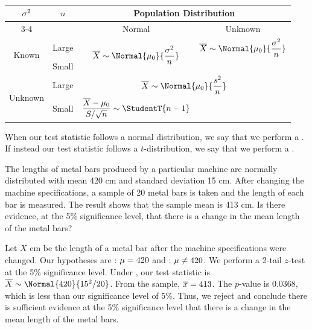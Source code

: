 \begin{table}[H]
    \centering
    \bgroup
    \def\arraystretch{2}
    \begin{tabular}{|c|c|cc|}
    \hline
    \multirow{2}{*}{$\sigma^2$} & \multirow{2}{*}{$n$} & \multicolumn{2}{c|}{Population Distribution} \\ \cline{3-4} 
    &  & \multicolumn{1}{c|}{Normal} & Unknown \\ \hline
    \multirow{2}{*}{Known} & Large & \multicolumn{1}{c|}{\multirow{2}{*}{$\displaystyle \ol{X} \sim \Normal{\m_0}{\frac{\s^2}{n}}$}} & \cellcolor{black!20} $\displaystyle \ol{X} \sim \Normal{\m_0}{\frac{\s^2}{n}}$ \\[0.2cm] \cline{2-2} \cline{4-4} 
    & Small & \multicolumn{1}{c|}{} & \cellcolor{black} \\ \hline
    \multirow{2}{*}{Unknown} & Large & \multicolumn{2}{c|}{\cellcolor{black!20} $\displaystyle \ol{X} \sim \Normal{\m_0}{\frac{s^2}{n}}$} \\[0.2cm] \cline{2-4} 
    & Small & \multicolumn{1}{c|}{$\displaystyle \frac{\ol{X} - \m_0}{S/\sqrt{n}} \sim \StudentT{n-1}$} & \cellcolor{black} \\[0.15cm] \hline
    \end{tabular}
    \egroup
    \caption{}
\end{table}

When our test statistic follows a normal distribution, we say that we perform a . If instead our test statistic follows a $t$-distribution, we say that we perform a .

\begin{sample}
    The lengths of metal bars produced by a particular machine are normally distributed with mean 420 cm and standard deviation 15 cm. After changing the machine specifications, a sample of 20 metal bars is taken and the length of each bar is measured. The result shows that the sample mean is 413 cm. Is there evidence, at the 5\% significance level, that there is a change in the mean length of the metal bars?
\end{sample}
\begin{sampans}
    Let $X$ cm be the length of a metal bar after the machine specifications were changed. Our hypotheses are \nullhyp: $\mu = 420$ and \althyp: $\mu \neq 420$. We perform a 2-tail $z$-test at the 5\% significance level. Under \nullhyp, our test statistic is $\ol{X} \sim \Normal{420}{15^2/20}$. From the sample, $\overline{x} = 413$. The $p$-value is $0.0368$, which is less than our significance level of 5\%. Thus, we reject \nullhyp{} and conclude there is sufficient evidence at the 5\% significance level that there is a change in the mean length of the metal bars.
\end{sampans}

